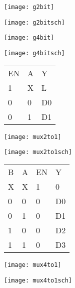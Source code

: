 
\begin{center}
  \texttt{[image: g2bit]} 
\end{center}
 \vspace{20mm}
\begin{center}
  \texttt{[image: g2bitsch]}
\end{center}


\begin{center}
  \texttt{[image: g4bit]}
\end{center}

\begin{center}
  \texttt{[image: g4bitsch]}
\end{center}


\begin{center}
\begin{tabular}{lll}
EN & A & Y \\  
1 & X & L \\ 
0 & 0 & D0 \\ 
0 & 1 & D1
\end{tabular} 
\end{center}

\begin{center}
\texttt{[image: mux2to1]}
\end{center}
\vspace{10mm}
\begin{center}
\texttt{[image: mux2to1sch]}
\end{center}


\vspace{5mm}
\begin{center}
\begin{tabular}{llll}
B & A & EN & Y \\ 
X & X & 1 & 0 \\ 
0 & 0 & 0 & D0 \\ 
0 & 1 & 0 & D1 \\ 
1 & 0 & 0 & D2 \\ 
1 & 1 & 0 & D3
\end{tabular}
\end{center}
\vspace{2mm}
\begin{center}
\texttt{[image: mux4to1]}
\end{center}
\begin{center}
  \texttt{[image: mux4to1sch]}
\end{center}

